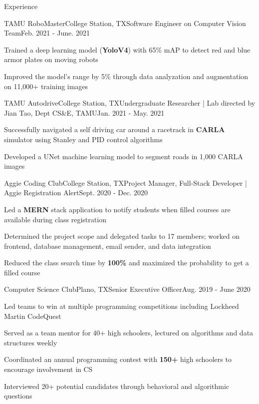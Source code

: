 \documentclass{resume} %
\begin{document}
\begin{rSection}{Experience}
\begin{rSubsection}{TAMU RoboMaster}{College Station, TX}{Software Engineer on Computer Vision Team}{Feb. 2021 - June. 2021}
    \item Trained a deep learning model (\textbf{YoloV4}) with 65\% mAP to detect red and blue armor plates on moving robots
    \item Improved the model's range by 5\% through data analyzation and augmentation on 11,000+ training images
\end{rSubsection}

\begin{rSubsection}{TAMU Autodrive}{College Station, TX}{Undergraduate Researcher | Lab directed by Jian Tao, Dept CS\&E, TAMU}{Jan. 2021 - May. 2021}
    \item Successfully navigated a self driving car around a racetrack in \textbf{CARLA} simulator using Stanley and PID control algorithms 
    \item Developed a UNet machine learning model to segment roads in 1,000 CARLA images
\end{rSubsection}

\begin{rSubsection}{Aggie Coding Club}{College Station, TX}{Project Manager, Full-Stack Developer | Aggie Registration Alert}{Sept. 2020 - Dec. 2020}
    \item Led a \textbf{MERN} stack application to notify students when filled courses are available during class registration
    \item Determined the project scope and delegated tasks to 17 members; worked on frontend, database management, email sender, and data integration
    \item Reduced the class search time by \textbf{100\%} and maximized the probability to get a filled course
\end{rSubsection}

\begin{rSubsection}{Computer Science Club}{Plano, TX}{Senior Executive Officer}{Aug. 2019 - June 2020}
    \item Led teams to win at multiple programming competitions including Lockheed Martin CodeQuest
    \item Served as a team mentor for 40+ high schoolers, lectured on algorithms and data structures weekly
    \item Coordinated an annual programming contest with \textbf{150+} high schoolers to encourage involvement in CS 
    \item Interviewed 20+ potential candidates through behavioral and algorithmic questions
\end{rSubsection}
\end{rSection}
\end{document}
